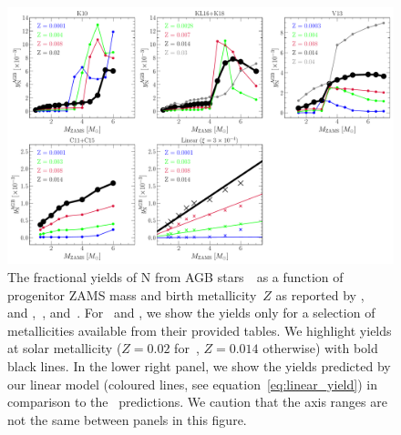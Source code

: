\documentclass[ms.tex]{subfiles}
\begin{document}
\begin{figure}
\centering
\includegraphics[scale = 0.45]{agb_yield_models.pdf}
\caption{
The fractional yields of N from AGB stars~~as a function of progenitor
ZAMS mass and birth metallicity~$Z$ as reported by
\citet[][upper left]{Karakas2010},~\citet{Karakas2016} and
\citet[][upper middle]{Karakas2018},~\citet[][upper right]{Ventura2013,
Ventura2014, Ventura2018, Ventura2020}, and~\citet[][lower right]{Cristallo2011,
Cristallo2015}.
For~\citet{Ventura2013, Ventura2014, Ventura2018, Ventura2020} and
\citet{Cristallo2011, Cristallo2015}, we show the yields only for a selection
of metallicities available from their provided tables.
We highlight yields at solar metallicity ($Z = 0.02$ for~\citealp{Karakas2010},
$Z = 0.014$ otherwise) with bold black lines.
In the lower right panel, we show the yields predicted by our linear model
(coloured lines, see equation~\ref{eq:linear_yield}) in comparison to
the~\citet[][coloured X's]{Cristallo2011, Cristallo2015} predictions.
We caution that the axis ranges are not the same between panels in this
figure.
}
\label{fig:agb_yield_models}
\end{figure}
\end{document}
